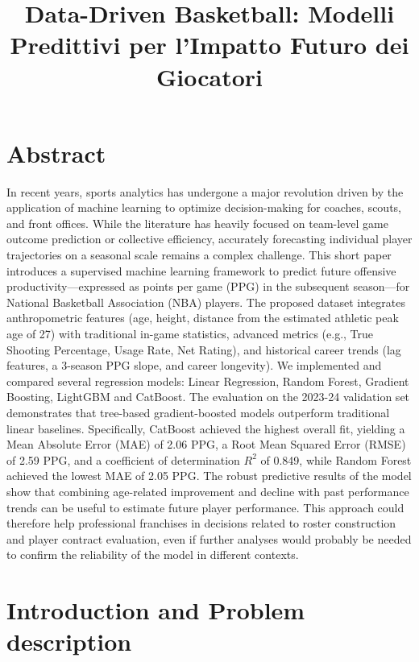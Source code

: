 \documentclass[conference]{IEEEtran}
\title{Data-Driven Basketball: Modelli Predittivi per l’Impatto Futuro dei Giocatori}
\author{
\IEEEauthorblockN{Simone Visconti}
\IEEEauthorblockA{
Università degli Studi di Salerno \\
s.visconti3@studenti.unisa.it
}

\and

\IEEEauthorblockN{Vincenzo Goffredo}
\IEEEauthorblockA{
Università degli Studi di Salerno \\
v.goffredo@studenti.unisa.it
}
}
\begin{document}
\maketitle

\section{Abstract}

In recent years, sports analytics has undergone a major revolution driven by the application of machine learning to optimize decision-making for coaches, scouts, and front offices. While the literature has heavily focused on team-level game outcome prediction or collective efficiency, accurately forecasting individual player trajectories on a seasonal scale remains a complex challenge. This short paper introduces a supervised machine learning framework to predict future offensive productivity—expressed as points per game (PPG) in the subsequent season—for National Basketball Association (NBA) players. The proposed dataset integrates anthropometric features (age, height, distance from the estimated athletic peak age of 27) with traditional in-game statistics, advanced metrics (e.g., True Shooting Percentage, Usage Rate, Net Rating), and historical career trends (lag features, a 3-season PPG slope, and career longevity). We implemented and compared several regression models: Linear Regression, Random Forest, Gradient Boosting, LightGBM and CatBoost. The evaluation on the 2023-24 validation set demonstrates that tree-based gradient-boosted models outperform traditional linear baselines. Specifically, CatBoost achieved the highest overall fit, yielding a Mean Absolute Error (MAE) of 2.06 PPG, a Root Mean Squared Error (RMSE) of 2.59 PPG, and a coefficient of determination $R^2$ of 0.849, while Random Forest achieved the lowest MAE of 2.05 PPG. The robust predictive results of the model show that combining age-related improvement and decline with past performance trends can be useful to estimate future player performance. This approach could therefore help professional franchises in decisions related to roster construction and player contract evaluation, even if further analyses would probably be needed to confirm the reliability of the model in different contexts.

\section{Introduction and Problem description}
\end{document}
